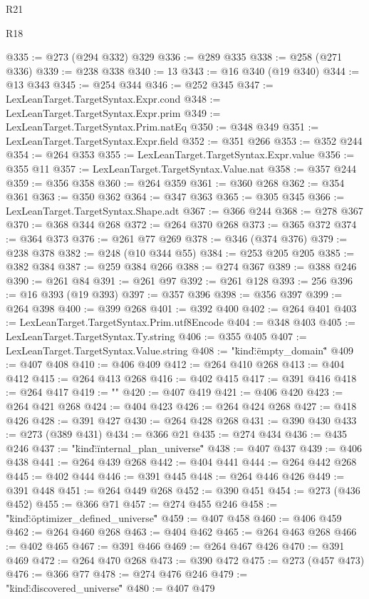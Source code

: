 \begin{lexlean}{R21}
\begin{lexlean}{R18}
\begin{coremodule}
{{{{{{{{{{{{{{{{{{{{{{{{{{{{{{{{{{{{{{{{{{{{{{{{{{{{{{{{{{{{{{{{{{{{{{{{{{{{{{{{{{{{{{{{{{{{{{{{{{{{{{{{{{{{{{{{{{{{{{{{{{{{@335 := @273 (@294 @332) @329
@336 := @289 @335
@338 := @258 (@271 @336)
@339 := @238 @338
@340 := 13
@343 := @16 @340 (@19 @340)
@344 := @13 @343
@345 := @254 @344
@346 := @252 @345
@347 := LexLeanTarget.TargetSyntax.Expr.cond
@348 := LexLeanTarget.TargetSyntax.Expr.prim
@349 := LexLeanTarget.TargetSyntax.Prim.natEq
@350 := @348 @349
@351 := LexLeanTarget.TargetSyntax.Expr.field
@352 := @351 @266
@353 := @352 @244
@354 := @264 @353
@355 := LexLeanTarget.TargetSyntax.Expr.value
@356 := @355 @11
@357 := LexLeanTarget.TargetSyntax.Value.nat
@358 := @357 @244
@359 := @356 @358
@360 := @264 @359
@361 := @360 @268
@362 := @354 @361
@363 := @350 @362
@364 := @347 @363
@365 := @305 @345
@366 := LexLeanTarget.TargetSyntax.Shape.adt
@367 := @366 @244
@368 := @278 @367
@370 := @368 @344 @268
@372 := @264 @370 @268
@373 := @365 @372
@374 := @364 @373
@376 := @261 @77 @269
@378 := @346 (@374 @376)
@379 := @238 @378
@382 := @248 (@10 @344 @55)
@384 := @253 @205 @205
@385 := @382 @384
@387 := @259 @384 @266
@388 := @274 @367
@389 := @388 @246
@390 := @261 @84
@391 := @261 @97
@392 := @261 @128
@393 := 256
@396 := @16 @393 (@19 @393)
@397 := @357 @396
@398 := @356 @397
@399 := @264 @398
@400 := @399 @268
@401 := @392 @400
@402 := @264 @401
@403 := LexLeanTarget.TargetSyntax.Prim.utf8Encode
@404 := @348 @403
@405 := LexLeanTarget.TargetSyntax.Ty.string
@406 := @355 @405
@407 := LexLeanTarget.TargetSyntax.Value.string
@408 := "{\"kind\":\"empty_domain\""
@409 := @407 @408
@410 := @406 @409
@412 := @264 @410 @268
@413 := @404 @412
@415 := @264 @413 @268
@416 := @402 @415
@417 := @391 @416
@418 := @264 @417
@419 := "}"
@420 := @407 @419
@421 := @406 @420
@423 := @264 @421 @268
@424 := @404 @423
@426 := @264 @424 @268
@427 := @418 @426
@428 := @391 @427
@430 := @264 @428 @268
@431 := @390 @430
@433 := @273 (@389 @431)
@434 := @366 @21
@435 := @274 @434
@436 := @435 @246
@437 := "{\"kind\":\"internal_plan_universe\""
@438 := @407 @437
@439 := @406 @438
@441 := @264 @439 @268
@442 := @404 @441
@444 := @264 @442 @268
@445 := @402 @444
@446 := @391 @445
@448 := @264 @446 @426
@449 := @391 @448
@451 := @264 @449 @268
@452 := @390 @451
@454 := @273 (@436 @452)
@455 := @366 @71
@457 := @274 @455 @246
@458 := "{\"kind\":\"optimizer_defined_universe\""
@459 := @407 @458
@460 := @406 @459
@462 := @264 @460 @268
@463 := @404 @462
@465 := @264 @463 @268
@466 := @402 @465
@467 := @391 @466
@469 := @264 @467 @426
@470 := @391 @469
@472 := @264 @470 @268
@473 := @390 @472
@475 := @273 (@457 @473)
@476 := @366 @77
@478 := @274 @476 @246
@479 := "{\"kind\":\"discovered_universe\""
@480 := @407 @479
}}}}}}}}}}}}}}}}}}}}}}}}}}}}}}}}}}}}}}}}}}}}}}}}}}}}}}}}}}}}}}}}}}}}}}}}}}}}}}}}}}}}}}}}}}}}}}}}}}}}}}}}}}}}}}}}}}}}}}}}}}}}}}}
\end{coremodule}
\end{lexlean}
\end{lexlean}
